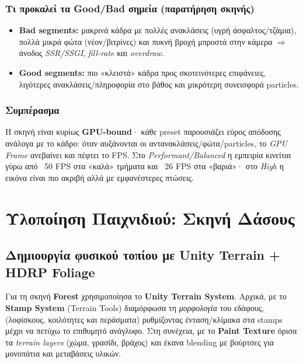 \subsection*{Τι προκαλεί τα Good/Bad σημεία (παρατήρηση σκηνής)}
\begin{itemize}
  \item \textbf{Bad segments:} μακρινά κάδρα με πολλές ανακλάσεις (υγρή άσφαλτος/τζάμια), πολλά μικρά φώτα (νέον/βιτρίνες) και πυκνή βροχή μπροστά στην κάμερα \(\Rightarrow\) άνοδος \textit{SSR/SSGI}, \textit{fill-rate} και \textit{overdraw}.
  \item \textbf{Good segments:} πιο «κλειστά» κάδρα προς σκοτεινότερες επιφάνειες, λιγότερες ανακλάσεις/πληροφορία στο βάθος και μικρότερη συνεισφορά particles.
\end{itemize}

\subsection*{Συμπέρασμα}
Η σκηνή είναι κυρίως \textbf{GPU-bound}· κάθε preset παρουσιάζει εύρος απόδοσης ανάλογα με το κάδρο: όταν αυξάνονται οι αντανακλάσεις/φώτα/particles, το \emph{GPU Frame} ανεβαίνει και πέφτει το FPS. Στο \emph{Performant/Balanced} η εμπειρία κινείται γύρω από ~50 FPS στα «καλά» τμήματα και ~26 FPS στα «βαριά»· στο \emph{High} η εικόνα είναι πιο ακριβή αλλά με εμφανέστερες πτώσεις.

\chapter{Υλοποίηση Παιχνιδιού: Σκηνή Δάσους}
\section{Δημιουργία φυσικού τοπίου με Unity Terrain + HDRP Foliage}
Για τη σκηνή \textbf{Forest} χρησιμοποίησα το \textbf{Unity Terrain System}. Αρχικά, με το \textbf{Stamp System} (Terrain Tools) διαμόρφωσα τη \textit{μορφολογία} του εδάφους,(λοφίσκους, κοιλότητες και περάσματα) ρυθμίζοντας ένταση/κλίμακα στα stamps μέχρι να πετύχω το επιθυμητό ανάγλυφο. Στη συνέχεια, με το \textbf{Paint Texture} όρισα τα \textit{terrain layers} (χώμα, γρασίδι, βράχος) και έκανα blending με βούρτσες για μονοπάτια και μεταβάσεις υλικών.

